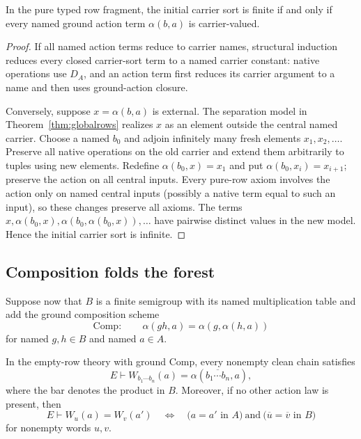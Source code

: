 \begin{proposition}\label{prop:shallowfinite}
In the pure typed row fragment, the initial carrier sort is finite if and only if every named ground action term $\alpha(b,a)$ is carrier-valued.
\end{proposition}

\begin{proof}
If all named action terms reduce to carrier names, structural induction reduces every closed carrier-sort term to a named carrier constant: native operations use $D_A$, and an action term first reduces its carrier argument to a name and then uses ground-action closure.

Conversely, suppose $x=\alpha(b,a)$ is external. The separation model
in Theorem~\ref{thm:globalrows} realizes $x$ as an element outside the
central named carrier. Choose a named $b_0$ and adjoin infinitely many
fresh elements $x_1,x_2,\ldots$. Preserve all native operations on the old
carrier and extend them arbitrarily to tuples using new elements.
Redefine $\alpha(b_0,x)=x_1$ and put
$\alpha(b_0,x_i)=x_{i+1}$; preserve the action on all central inputs.
Every pure-row axiom involves the action only on named central inputs
(possibly a native term equal to such an input), so these changes preserve
all axioms. The terms $x,\alpha(b_0,x),\alpha(b_0,\alpha(b_0,x)),\ldots$
have pairwise distinct values in the new model. Hence the initial carrier
sort is infinite.
\end{proof}

\subsection{Composition folds the forest}

Suppose now that $B$ is a finite semigroup with its named multiplication table and add the ground composition scheme
\begin{equation}\label{eq:Comp}
\mathrm{Comp}:\qquad
\alpha(gh,a)=\alpha(g,\alpha(h,a))
\end{equation}
for named $g,h\in B$ and named $a\in A$.

\begin{proposition}\label{prop:cayley}
In the empty-row theory with ground Comp, every nonempty clean chain satisfies
\[
E\vdash W_{b_1\cdots b_n}(a)
=
\alpha(\overline{b_1\cdots b_n},a),
\]
where the bar denotes the product in $B$.  Moreover, if no other action law is present, then
\[
E\vdash W_u(a)=W_v(a')
\quad\Longleftrightarrow\quad
\bigl(a=a'\text{ in }A\bigr)
\ \text{and}\
\bigl(\overline u=\overline v\text{ in }B\bigr)
\]
for nonempty words $u,v$.
\end{proposition}

